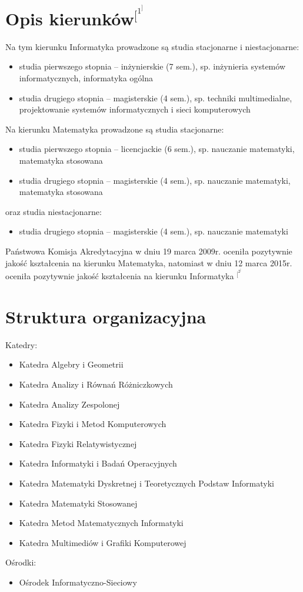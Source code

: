 ﻿\documentclass[a4paper,12pt]{article}
\begin{document}
\section*{Opis kierunków$^[^1^]$}


Na tym kierunku Informatyka prowadzone są studia stacjonarne i niestacjonarne:
\begin{itemize}
\item studia pierwszego stopnia – inżynierskie (7 sem.), sp. inżynieria systemów informatycznych, informatyka
ogólna
\item studia drugiego stopnia – magisterskie (4 sem.), sp. techniki multimedialne, projektowanie systemów
informatycznych i sieci komputerowych
\end{itemize}
Na kierunku Matematyka prowadzone są studia stacjonarne:
\begin{itemize}
\item studia pierwszego stopnia – licencjackie (6 sem.), sp. nauczanie matematyki, matematyka stosowana
\item studia drugiego stopnia – magisterskie (4 sem.), sp. nauczanie matematyki, matematyka stosowana
\end{itemize}
oraz studia niestacjonarne:
\begin{itemize}
\item studia drugiego stopnia – magisterskie (4 sem.), sp. nauczanie matematyki
\end{itemize}
\vspace{0.2cm}Państwowa Komisja Akredytacyjna w dniu 19 marca 2009r. oceniła pozytywnie jakość kształcenia na\vspace{0.1cm} kierunku
Matematyka, natomiast w dniu 12 marca 2015r. oceniła pozytywnie jakość kształcenia na\vspace{0.1cm} kierunku
Informatyka $^[^2^]$
\section*{ Struktura organizacyjna}
Katedry:
\begin{itemize}
\item Katedra Algebry i Geometrii
\item Katedra Analizy i Równań Różniczkowych
\item Katedra Analizy Zespolonej
\item Katedra Fizyki i Metod Komputerowych
\item Katedra Fizyki Relatywistycznej
\item Katedra Informatyki i Badań Operacyjnych
\item Katedra Matematyki Dyskretnej i Teoretycznych Podstaw Informatyki
\item Katedra Matematyki Stosowanej
\item Katedra Metod Matematycznych Informatyki
\item Katedra Multimediów i Grafiki Komputerowej
\end{itemize}
Ośrodki:
\begin{itemize}
\item Ośrodek Informatyczno-Sieciowy
\end{itemize}
\end{document}
